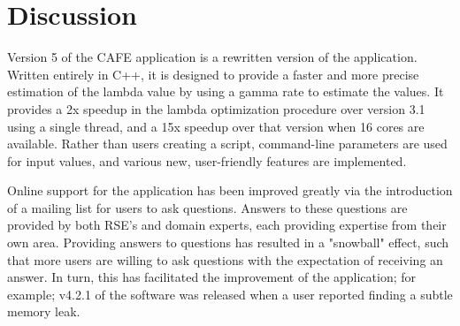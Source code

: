 \documentclass[acmtog, authorversion]{acmart}
\begin{document}



  
\section{Discussion} \label{sec:discuss}
Version 5 of the CAFE application is a rewritten version of the application. Written entirely in C++, it is designed to provide a faster and more precise estimation of the lambda value by using a gamma rate to estimate the values. It provides a 2x speedup in the lambda optimization procedure over version 3.1 using a single thread, and a 15x speedup over that version when 16 cores are available. Rather than users creating a script, command-line parameters are used for input values, and various new, user-friendly features are implemented.
    
Online support for the application has been improved greatly via the introduction of a mailing list for users to ask questions. Answers to these questions are provided by both RSE's and domain experts, each providing expertise from their own area. Providing answers to questions has resulted in a "snowball" effect, such that more users are willing to ask questions with the expectation of receiving an answer. In turn, this has facilitated the improvement of the application; for example; v4.2.1 of the software was released when a user reported finding a subtle memory leak.
\end{document}
